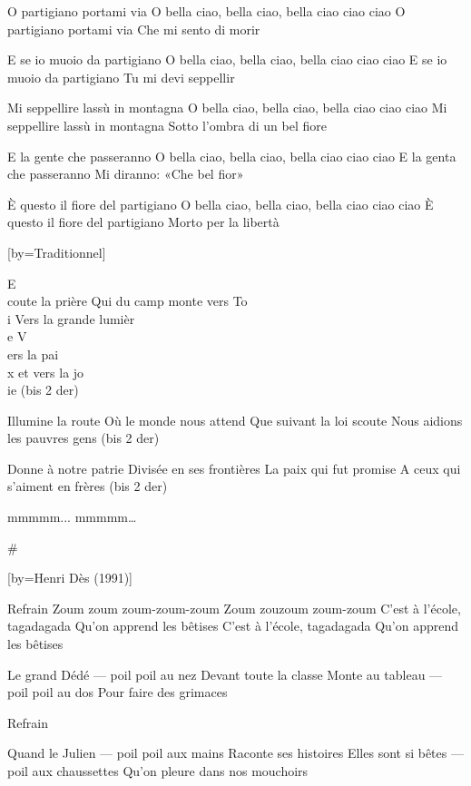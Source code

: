 \beginverse
O partigiano portami via
O bella ciao, bella ciao, bella ciao ciao ciao
O partigiano portami via
Che mi sento di morir
\endverse

\beginverse
E se io muoio da partigiano
O bella ciao, bella ciao, bella ciao ciao ciao
E se io muoio da partigiano
Tu mi devi seppellir
\endverse

\beginverse
Mi seppellire lassù in montagna
O bella ciao, bella ciao, bella ciao ciao ciao
Mi seppellire lassù in montagna
Sotto l'ombra di un bel fiore
\endverse

\beginverse
E la gente che passeranno
O bella ciao, bella ciao, bella ciao ciao ciao
E la genta che passeranno
Mi diranno: «Che bel fior»
\endverse

\beginverse
È questo il fiore del partigiano
O bella ciao, bella ciao, bella ciao ciao ciao
È questo il fiore del partigiano
Morto per la libertà
\endverse

[by={Traditionnel}]

\beginverse
E\\[Do]coute la prière
Qui du camp monte vers To\\[Sol7]i
Vers la grande lumièr\\[Do]e
V\\[Rém]ers la pai\\[Sol7]x et vers la jo\\[Do]ie
(bis 2 der)
\endverse

\beginverse
Illumine la route
Où le monde nous attend
Que suivant la loi scoute
Nous aidions les pauvres gens
(bis 2 der)
\endverse

\beginverse
Donne à notre patrie
Divisée en ses frontières
La paix qui fut promise
A ceux qui s'aiment en frères
(bis 2 der)
\endverse

\beginverse
mmmmm...
mmmmm…
\endverse

# 

[by={Henri Dès (1991)}]

\beginverse
Refrain
Zoum zoum zoum-zoum-zoum
Zoum zouzoum zoum-zoum
C’est à l’école, tagadagada
Qu’on apprend les bêtises
C’est à l’école, tagadagada
Qu’on apprend les bêtises
\endverse

\beginverse
Le grand Dédé — poil poil au nez
Devant toute la classe
Monte au tableau — poil poil au dos
Pour faire des grimaces
\endverse

\beginverse
Refrain
\endverse

\beginverse
Quand le Julien — poil poil aux mains
Raconte ses histoires
Elles sont si bêtes — poil aux chaussettes
Qu’on pleure dans nos mouchoirs
\endverse

